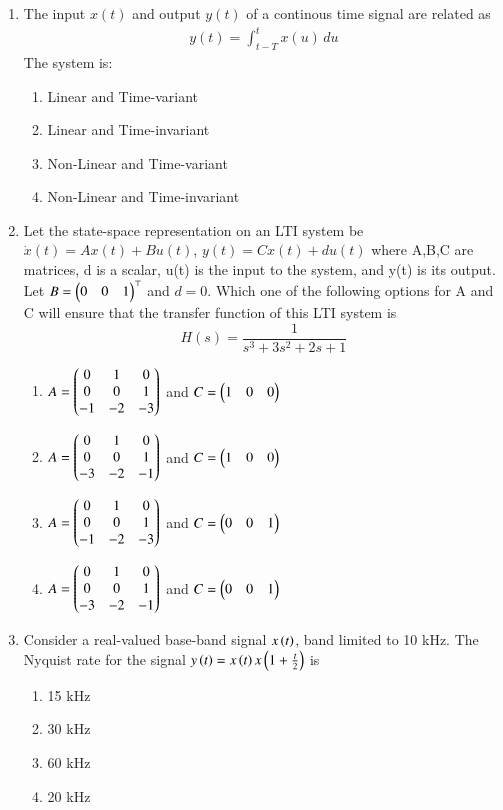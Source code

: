 \begin{enumerate}[label=\arabic*.,ref=\theenumi]
\item The input $x(t)$ and output $y(t)$ of a continous time signal are related as
\begin{align}
    y(t) = \int_{t-T}^tx(u)\,du
\end{align}
The system is:
\begin{enumerate}
    \item Linear and Time-variant
    \item Linear and Time-invariant
    \item Non-Linear and Time-variant
    \item Non-Linear and Time-invariant
\end{enumerate}
\solution



\item Let the state-space representation on an LTI system be $\dot{x}(t) = Ax(t)+Bu(t)$, $y(t)=Cx(t)+du(t)$ where A,B,C are matrices,  d is a scalar, u(t) is the input to the system, and y(t) is its output. Let $B = \begin{pmatrix} 0 & 0 &  1\end{pmatrix}^\top$ and $d = 0$. Which one of the following options for A and C will ensure that the transfer function of this LTI system is 
\begin{equation}
    H(s) = \dfrac{1}{s^3+3s^2+2s+1}
\end{equation}

\begin{enumerate}[label = (\Alph*)]
    \item $A = \begin{pmatrix}
     0 &  1 &  0\\ 
     0 &  0 &  1\\
    -1 & -2 & -3
    \end{pmatrix}$ and $C = \begin{pmatrix}1 & 0 & 0\end{pmatrix}$
    \item $A = \begin{pmatrix}
     0 &  1 &  0\\ 
     0 &  0 &  1\\
    -3 & -2 & -1
    \end{pmatrix}$ and $C = \begin{pmatrix}1 & 0 & 0\end{pmatrix}$
    \item $A = \begin{pmatrix}
     0 &  1 &  0\\ 
     0 &  0 &  1\\
    -1 & -2 & -3
    \end{pmatrix}$ and $C = \begin{pmatrix}0 & 0 & 1\end{pmatrix}$
    \item $A = \begin{pmatrix}
     0 &  1 &  0\\ 
     0 &  0 &  1\\
    -3 & -2 & -1
    \end{pmatrix}$ and $C = \begin{pmatrix}0 & 0 & 1\end{pmatrix}$
    \end{enumerate}
%
\solution

%
\item Consider a real-valued base-band signal $x\left(t\right)$, band limited to 10 kHz. The Nyquist rate for the signal $y\left(t\right) = x\left(t\right)x\left(1+\frac{t}{2}\right)$ is
\begin{enumerate}
    \item 15 kHz
    \item 30 kHz
    \item 60 kHz
    \item 20 kHz
\end{enumerate}
\solution



\end{enumerate}